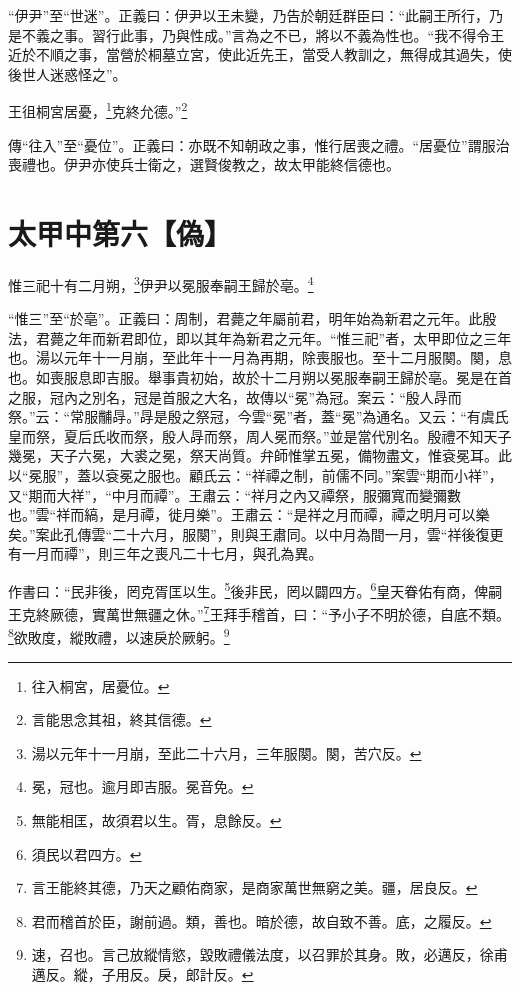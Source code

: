{\noindent\shu{}\fzkt “伊尹”至“世迷”。正義曰：伊尹以王未變，乃告於朝廷群臣曰：“此嗣王所行，乃是不義之事。習行此事，乃與性成。”言為之不已，將以不義為性也。“我不得令王近於不順之事，當營於桐墓立宮，使此近先王，當受人教訓之，無得成其過失，使後世人迷惑怪之”。 \par}

王徂桐宮居憂，\footnote{往入桐宮，居憂位。}克終允德。”\footnote{言能思念其祖，終其信德。}

{\noindent\zhuan{}\fzbyks 傳“往入”至“憂位”。正義曰：亦既不知朝政之事，惟行居喪之禮。“居憂位”謂服治喪禮也。伊尹亦使兵士衛之，選賢俊教之，故太甲能終信德也。 \par}

\section{太甲中第六【偽】}


惟三祀十有二月朔，\footnote{湯以元年十一月崩，至此二十六月，三年服闋。闋，苦穴反。}伊尹以冕服奉嗣王歸於亳。\footnote{冕，冠也。逾月即吉服。冕音免。}

{\noindent\shu{}\fzkt “惟三”至“於亳”。正義曰：周制，君薨之年屬前君，明年始為新君之元年。此殷法，君薨之年而新君即位，即以其年為新君之元年。“惟三祀”者，太甲即位之三年也。湯以元年十一月崩，至此年十一月為再期，除喪服也。至十二月服闋。闋，息也。如喪服息即吉服。舉事貴初始，故於十二月朔以冕服奉嗣王歸於亳。冕是在首之服，冠內之別名，冠是首服之大名，故傳以“冕”為冠。案云：“殷人冔而祭。”云：“常服黼冔。”冔是殷之祭冠，今雲“冕”者，蓋“冕”為通名。又云：“有虞氏皇而祭，夏后氏收而祭，殷人冔而祭，周人冕而祭。”並是當代別名。殷禮不知天子幾冕，天子六冕，大裘之冕，祭天尚質。弁師惟掌五冕，備物盡文，惟袞冕耳。此以“冕服”，蓋以袞冕之服也。顧氏云：“祥禫之制，前儒不同。”案雲“期而小祥”，又“期而大祥”，“中月而禫”。王肅云：“祥月之內又禫祭，服彌寬而變彌數也。”雲“祥而縞，是月禫，徙月樂”。王肅云：“是祥之月而禫，禫之明月可以樂矣。”案此孔傳雲“二十六月，服闋”，則與王肅同。以中月為間一月，雲“祥後復更有一月而禫”，則三年之喪凡二十七月，與孔為異。 \par}

作書曰：“民非後，罔克胥匡以生。\footnote{無能相匡，故須君以生。胥，息餘反。}後非民，罔以闢四方。\footnote{須民以君四方。}皇天眷佑有商，俾嗣王克終厥德，實萬世無疆之休。”\footnote{言王能終其德，乃天之顧佑商家，是商家萬世無窮之美。疆，居良反。}王拜手稽首，曰：“予小子不明於德，自底不類。\footnote{君而稽首於臣，謝前過。類，善也。暗於德，故自致不善。底，之履反。}欲敗度，縱敗禮，以速戾於厥躬。\footnote{速，召也。言己放縱情慾，毀敗禮儀法度，以召罪於其身。敗，必邁反，徐甫邁反。縱，子用反。戾，郎計反。}

